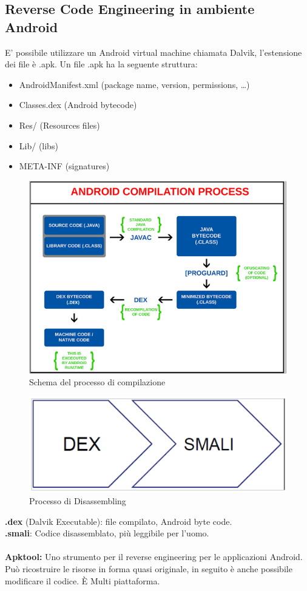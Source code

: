 \documentclass[8pt]{extarticle}
\begin{document}
\subsection{Reverse Code Engineering in ambiente Android}
E’ possibile utilizzare un Android virtual machine chiamata Dalvik, l’estensione dei file è .apk.
Un file .apk ha la seguente struttura:
\begin{itemize}
    \item AndroidManifest.xml (package name, version, permissions, \dots)
    \item Classes.dex (Android bytecode)
    \item Res/ (Resources files)
    \item Lib/ (libs)
    \item META-INF (signatures)
\end{itemize}
\begin{figure}[H]
    \center
    \includegraphics[scale=0.27]{images/RCE3.png}
    \caption{Schema del processo di compilazione}\label{fig:1}
\end{figure}
\begin{figure}[H]
    \center
    \includegraphics[scale=0.3]{images/RCE4.png}
    \caption{Processo di Disassembling}\label{fig:1}
\end{figure}
\noindent
\textbf{.dex} (Dalvik Executable): file compilato, Android byte code.\\
\textbf{.smali}: Codice disassemblato, più leggibile per l’uomo. \\\\
\textbf{Apktool:} Uno strumento per il reverse engineering per le applicazioni Android. Può ricostruire 
le risorse in forma quasi originale, in seguito è anche possibile modificare il codice. È Multi piattaforma.
\end{document}
